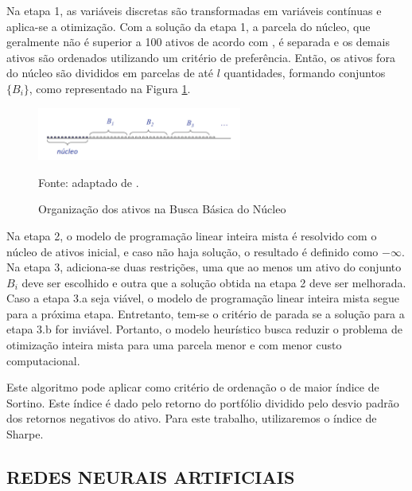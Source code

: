                     \ipar Na etapa 1, as variáveis discretas são transformadas em variáveis contínuas e aplica-se a otimização. Com a solução da etapa 1, a parcela do núcleo, que geralmente não é superior a 100 ativos de acordo com , é separada e os demais ativos são ordenados utilizando um critério de preferência. Então, os ativos fora do núcleo são divididos em parcelas de até $l$ quantidades, formando conjuntos $\{B_i\}$, como representado na Figura \ref{fig:parcelas}. 
                
                    \begin{figure}[H]
                        \centering
                        \caption{Organização dos ativos na Busca Básica do Núcleo}
                        \includegraphics[width=0.6\textwidth]{imagens/parcelas.png}
                        \label{fig:parcelas}
                        \par \footnotesize Fonte: adaptado de . %
                    \end{figure}
                
                    \ipar Na etapa 2, o modelo de programação linear inteira mista é resolvido com o núcleo de ativos inicial, e caso não haja solução, o resultado é definido como $-\infty$. Na etapa 3, adiciona-se duas restrições, uma que ao menos um ativo do conjunto $B_i$ deve ser escolhido e outra que a solução obtida na etapa 2 deve ser melhorada. Caso a etapa 3.a seja viável, o modelo de programação linear inteira mista segue para a próxima etapa. Entretanto, tem-se o critério de parada se a solução para a etapa 3.b for inviável. Portanto, o modelo heurístico busca reduzir o problema de otimização inteira mista para uma parcela menor e com menor custo computacional. 

                    \ipar Este algoritmo pode aplicar como critério de ordenação o de maior índice de Sortino. Este índice é dado pelo retorno do portfólio dividido pelo desvio padrão dos retornos negativos do ativo. Para este trabalho, utilizaremos o índice de Sharpe.
       
    \subsection{REDES NEURAIS ARTIFICIAIS}
        \label{sec:redesneurais}

